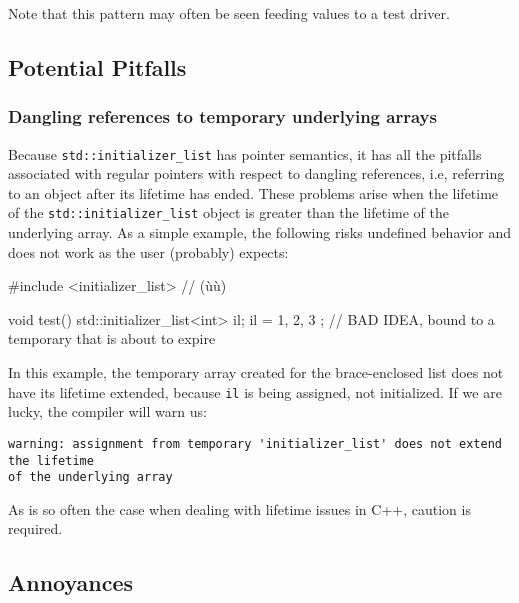 \noindent Note that this pattern may often be seen feeding values to a test
driver.

\subsection[Potential Pitfalls]{Potential Pitfalls}\label{potential-pitfalls}

\subsubsection[Dangling references to temporary underlying arrays]{Dangling references to temporary underlying arrays}\label{dangling-references-to-temporary-underlying-arrays}

Because \lstinline!std::initializer_list! has pointer semantics, it has
all the pitfalls associated with regular pointers with respect to
dangling references, i.e, referring to an object after its lifetime has
ended. These problems arise when the lifetime of the
\lstinline!std::initializer_list! object is greater than the lifetime of
the underlying array. As a simple example, the following risks undefined
behavior and does not work as the user (probably) expects:

\begin{emcppshiddenlisting}[emcppsbatch=e8]
#include <initializer_list>  // (ù{}ù)
\end{emcppshiddenlisting}
\begin{emcppslisting}[emcppsbatch=e8]
void test()
{
    std::initializer_list<int> il;
    il = { 1, 2, 3 };  // BAD IDEA, bound to a temporary that is about to expire
}
\end{emcppslisting}
    

\noindent In this example, the temporary array created for the brace-enclosed list
does not have its lifetime extended, because \lstinline!il! is being
assigned, not initialized. If we are lucky, the compiler will warn us:

\begin{lstlisting}[style=plain]
warning: assignment from temporary 'initializer_list' does not extend the lifetime 
of the underlying array
\end{lstlisting}
    

\noindent As is so often the case when dealing with lifetime issues in C++,
caution is required.

\subsection[Annoyances]{Annoyances}\label{annoyances-initializerlist}

